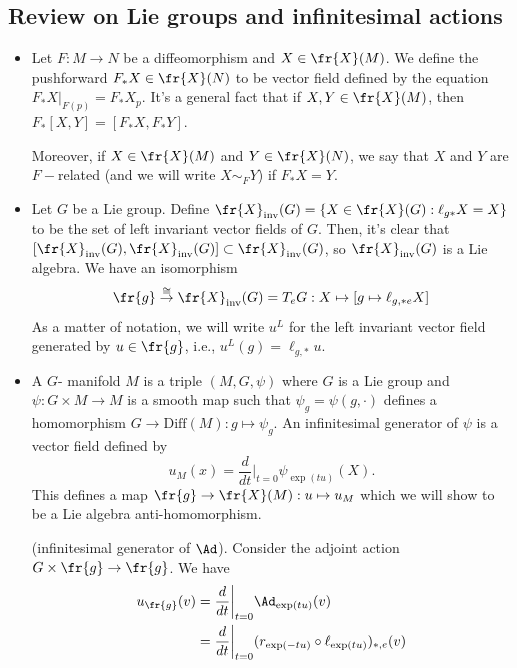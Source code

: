 \subsection{Review on Lie groups and infinitesimal actions}
\begin{itemize}
    \item Let $F:M\rightarrow N$ be a diffeomorphism and $X\in\fr{X}(M)$. We define the pushforward 
    $F_*X\in\fr{X}(N)$ to be vector field defined by the equation $F_*X |_{F(p)}=F_*X_p$. It's a general fact that 
    if $X,Y\in\fr{X}(M)$, then $F_*[X,Y]=[F_*X,F_*Y]$.\par 
    Moreover, if $X\in\fr{X}(M)$ and $Y\in\fr{X}(N)$, we say that $X$ and $Y$ are $F-$related (and we will write 
    $X\sim_FY$) if $F_*X=Y$.
    \item Let $G$ be a Lie group. Define $\fr{X}_{\text{inv}}(G)=\{X\in\fr{X}(G):\ell_{g*}X=X\}$ to be the set of 
    left invariant vector fields of $G$. Then, it's clear that 
    $[\fr{X}_{\text{inv}}(G),\fr{X}_{\text{inv}}(G)]\subset \fr{X}_{\text{inv}}(G)$, so $\fr{X}_{\text{inv}}(G)$ is a 
    Lie algebra. We have an isomorphism 
    \begin{equation}
        \fr{g}\overset{\cong}{\to}\fr{X}_{\text{inv}}(G)=T_eG: X\mapsto [g\mapsto \ell_{g,*e}X]
    \end{equation}
    As a matter of notation, we will write $u^L$ for the left invariant vector field generated by $u\in\fr{g}$, i.e.,
    $u^L(g)=\ell_{g,*}u$.
    \item A $G$- manifold $M$ is a triple $(M,G,\psi)$ where $G$ is a Lie group and 
    $\psi:G\times M\to M$ is a smooth map such that $\psi_g=\psi(g,\cdot)$ defines a homomorphism 
    $G\to\text{Diff}(M):g\mapsto \psi_g$. An infinitesimal generator of $\psi$ is a vector field defined by 
    \begin{equation}
        u_M(x)=\frac{d}{dt}\bigg|_{t=0}\psi_{\exp(tu)}(X).
    \end{equation}
    This defines a map $\fr{g}\to\fr{X}(M):u\mapsto u_M$ which we will show to be a Lie algebra anti-homomorphism.
    \begin{example}
        (infinitesimal generator of $\Ad$). Consider the adjoint action $G\times\fr{g}\to\fr{g}$. We have 
        \begin{equation}
            \begin{split}
                u_{\fr{g}}(v)&=\frac{d}{dt}\bigg|_{t=0}\Ad_{\exp(tu)}(v)\\
                &=\frac{d}{dt}\bigg|_{t=0}(r_{\exp(-tu)}\circ \ell_{\exp(tu)})_{*,e}(v)\\

\end{split}
\end{equation}
\end{example}
\end{itemize}
